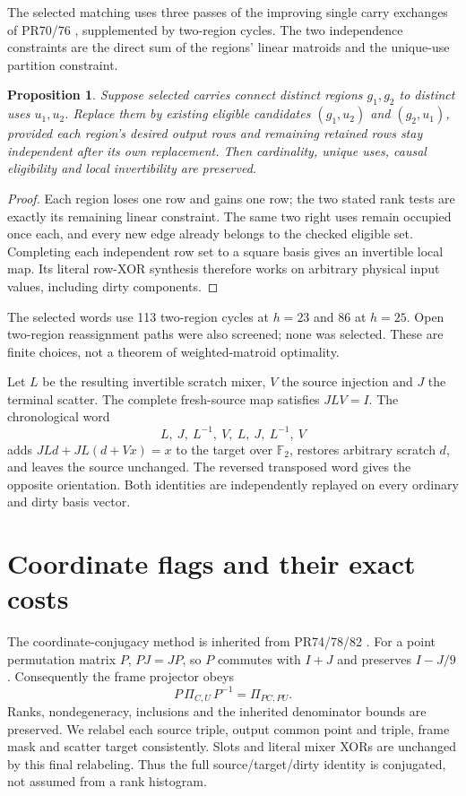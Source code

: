 \documentclass[11pt]{article}
\newtheorem{proposition}{Proposition}
\newcommand{\F}{\mathbb F_2}
\begin{document}
The selected matching uses three passes of the improving single carry
exchanges of PR70/76 \cite{pr70,pr76}, supplemented by two-region cycles.
The two independence constraints are the direct sum of the regions' linear
matroids and the unique-use partition constraint.
\begin{proposition}
Suppose selected carries connect distinct regions \(g_1,g_2\) to distinct
uses \(u_1,u_2\). Replace them by existing eligible candidates
\((g_1,u_2)\) and \((g_2,u_1)\), provided each region's desired output rows
and remaining retained rows stay independent after its own replacement.
Then cardinality, unique uses, causal eligibility and local invertibility
are preserved.
\end{proposition}
\begin{proof}
Each region loses one row and gains one row; the two stated rank tests
are exactly its remaining linear constraint. The same two right uses remain
occupied once each, and every new edge already belongs to the checked
eligible set. Completing each independent row set to a square basis gives
an invertible local map. Its literal row-XOR synthesis therefore works on
arbitrary physical input values, including dirty components.
\end{proof}
The selected words use 113 two-region cycles at \(h=23\) and 86 at \(h=25\).
Open two-region reassignment paths were also screened; none was selected.
These are finite choices, not a theorem of weighted-matroid optimality.

Let \(L\) be the resulting invertible scratch mixer, \(V\) the source
injection and \(J\) the terminal scatter. The complete fresh-source map
satisfies \(JLV=I\). The chronological word
\[
 L,\ J,\ L^{-1},\ V,\ L,\ J,\ L^{-1},\ V             \tag{4}
\]
adds \(JLd+JL(d+Vx)=x\) to the target over \(\F\), restores arbitrary
scratch \(d\), and leaves the source unchanged. The reversed transposed
word gives the opposite orientation. Both identities are independently
replayed on every ordinary and dirty basis vector.

\section{Coordinate flags and their exact costs}
The coordinate-conjugacy method is inherited from PR74/78/82
\cite{pr74,pr82}. For a point permutation matrix \(P\),
\(PJ=JP\), so \(P\) commutes with \(I+J\) and preserves \(I-J/9\).
Consequently the frame projector obeys
\[
 P\,\Pi_{C,U}\,P^{-1}=\Pi_{PC,PU}.                   \tag{5}
\]
Ranks, nondegeneracy, inclusions and the inherited denominator bounds are
preserved. We relabel each source triple, output common point and triple,
frame mask and scatter target consistently. Slots and literal mixer XORs
are unchanged by this final relabeling. Thus the full source/target/dirty
identity is conjugated, not assumed from a rank histogram.
\end{document}
